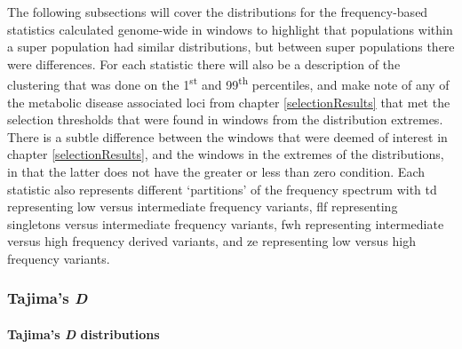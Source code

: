 \documentclass[twoside,openright]{report}
\let\oldparagraph\paragraph
\renewcommand{\paragraph}[1]{\oldparagraph{#1}\mbox{}}
\begin{document}
The following subsections will cover the distributions for the
frequency-based statistics calculated genome-wide in windows to
highlight that populations within a super population had similar
distributions, but between super populations there were differences. For
each statistic there will also be a description of the clustering that
was done on the 1\textsuperscript{st} and 99\textsuperscript{th}
percentiles, and make note of any of the metabolic disease associated
loci from chapter \ref{selectionResults} that met the selection
thresholds that were found in windows from the distribution extremes.
There is a subtle difference between the windows that were deemed of
interest in chapter \ref{selectionResults}, and the windows in the
extremes of the distributions, in that the latter does not have the
greater or less than zero condition. Each statistic also represents
different `partitions' of the frequency spectrum with \gls{td}
representing low versus intermediate frequency variants, \gls{flf}
representing singletons versus intermediate frequency variants,
\gls{fwh} representing intermediate versus high frequency derived
variants, and \gls{ze} representing low versus high frequency variants.

\subsubsection{\texorpdfstring{Tajima's
\emph{D}}{Tajima's D}}\label{tajimas-d-1}

\paragraph{\texorpdfstring{Tajima's \emph{D}
distributions}{Tajima's D distributions}}\label{tdDist}
\end{document}

